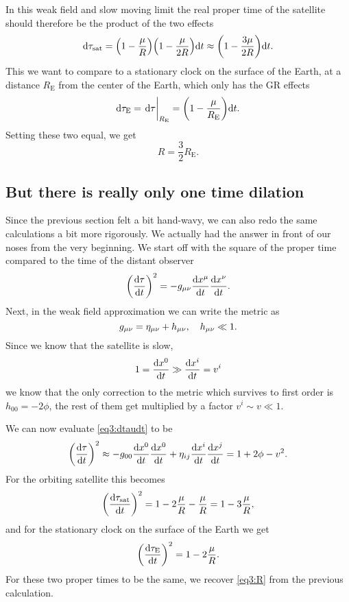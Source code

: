 \documentclass[11pt,a4paper, 
swedish, english %
]{article}
\newcommand{\E}{\text{E}}
\begin{document}
In this weak field and slow moving limit the real proper time of the
satellite should therefore be the product of the two effects
\begin{equation}
\mathrm{d}\tau_\text{sat}=\qty(1-\frac{\mu}{R})\qty(1-\frac{\mu}{2R})\mathrm{d}{t}
\approx\qty(1-\frac{3\mu}{2R})\mathrm{d}{t}.
\end{equation}
This we want to compare to a stationary clock on the surface of the
Earth, at a distance $R_\E$ from the center of the Earth, which only
has the GR effects 
\begin{equation}
\rd\tau_\E=\eval{\rd\tau}_{R_\E}=\qty(1-\frac{\mu}{R_\E})\rd{t}.
\end{equation}
Setting these two equal, we get
\begin{equation}\label{eq3:R}
R=\frac{3}{2}R_\E.
\end{equation}


\subsection{But there is really only one time dilation}
Since the previous section felt a bit hand-wavy, we can also redo the
same calculations a bit more rigorously. We actually had the answer in
front of our noses from the very beginning. We start off with the
square of the proper time compared to the time of the distant observer 
\begin{equation}\label{eq3:dtaudt}
\qty(\frac{\mathrm{d}\tau}{\mathrm{d}{t}})^2=
-g_{\mu\nu}\frac{\mathrm{d}{x}^\mu}{\mathrm{d}{t}}\frac{\mathrm{d}{x}^\nu}{\mathrm{d}{t}}.
\end{equation}
Next, in the weak field approximation we can write the metric as
\begin{equation}
g_{\mu\nu}=\eta_{\mu\nu}+h_{\mu\nu}\qc h_{\mu\nu}\ll1.
\end{equation}
Since we know that the satellite is slow,
\begin{equation}
1=\dv{x^0}{t}\gg\dv{x^i}{t}= v^i
\end{equation}
we know that the only correction to the metric which survives to first
order is $h_{00}=-2\phi$, the rest of them get multiplied by a factor
$v^i\sim v\ll1$.

We can now evaluate \eqref{eq3:dtaudt} to be
\begin{equation}
\qty(\frac{\mathrm{d}\tau}{\mathrm{d}{t}})^2\approx
-g_{00}\dv{x^0}{t}\dv{x^0}{t}
+\eta_{ij}\dv{x^i}{t}\dv{x^j}{t}
=1+2\phi-v^2.
\end{equation}
For the orbiting satellite this becomes
\begin{equation}
\qty(\frac{\mathrm{d}\tau_\text{sat}}{\mathrm{d}{t}})^2
=1-2\frac{\mu}{R}-\frac{\mu}{R}
=1-3\frac{\mu}{R},
\end{equation}
and for the stationary clock on the surface of the Earth we get
\begin{equation}
\qty(\frac{\mathrm{d}\tau_\text{E}}{\mathrm{d}{t}})^2=1-2\frac{\mu}{R}.
\end{equation}
For these two proper times to be the same, we recover \eqref{eq3:R}
from the previous calculation.
\end{document}
